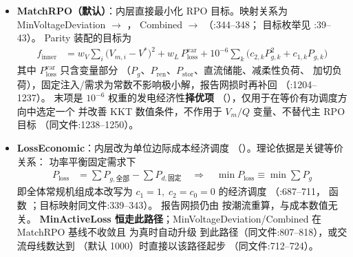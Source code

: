 \begin{itemize}
  \item \textbf{MatchRPO（默认）}：内层直接最小化 RPO 目标。映射关系为
        MinVoltageDeviation $\to$ ，
        Combined $\to$ 
        （:344--348；
        目标枚举见 :39--43）。
        Parity 装配的目标为
        \begin{align*}
        f_{\mathrm{inner}} &= w_V\sum_{i}\bigl(V_{m,i}-V^{*}\bigr)^{2}
          + w_L\,P_{\mathrm{loss}}^{\mathrm{var}}
          + 10^{-6}\sum_{k}\bigl(c_{2,k}P_{g,k}^{2}+c_{1,k}P_{g,k}\bigr)
        \end{align*}
        其中 $P_{\mathrm{loss}}^{\mathrm{var}}$ 只含变量部分
        （$P_g$、$P_{\mathrm{ren}}$、$P_{\mathrm{stor}}$、直流储能、减柔性负荷、
        加切负荷），固定注入/需求为常数不影响极小解，报告网损时再补回
        （:1204--1237）。
        末项是 $10^{-6}$ 权重的发电经济性\textbf{择优项}
        （），仅用于在等价有功调度方向中选定一个
        并改善 KKT 数值条件，不作用于 $V_m/Q$ 变量、不替代主 RPO 目标
        （同文件:1238--1250）。
  \item \textbf{LossEconomic}：内层改为单位边际成本经济调度
        （）。理论依据是关键等价关系：
        功率平衡固定需求下
        \begin{align*}
        P_{\mathrm{loss}} &= \sum P_{g,\text{全部}} - \sum P_{d,\text{固定}}
        \quad\Longrightarrow\quad
        \min P_{\mathrm{loss}} \equiv \min \sum P_g
        \end{align*}
        即全体常规机组成本改写为 $c_1=1,\;c_2=c_0=0$ 的经济调度
        （:687--711，
        函数 ；目标映射同文件:339--343）。
        报告网损仍由  按潮流重算，与成本数值无关。
        \textbf{MinActiveLoss 恒走此路径}；MinVoltageDeviation/Combined 在
        MatchRPO 基线不收敛且  为真时自动升级
        到此路径（同文件:807--818），或交流母线数达到
        （默认 1000）时直接以该路径起步
        （同文件:712--724）。
\end{itemize}

